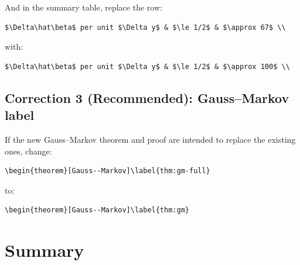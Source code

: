 And in the summary table, replace the row:

\begin{verbatim}
$\Delta\hat\beta$ per unit $\Delta y$ & $\le 1/2$ & $\approx 67$ \\
\end{verbatim}

with:

\begin{verbatim}
$\Delta\hat\beta$ per unit $\Delta y$ & $\le 1/2$ & $\approx 100$ \\
\end{verbatim}



\subsection*{Correction 3 (Recommended): Gauss--Markov label}

If the new Gauss--Markov theorem and proof are intended to replace the
existing ones, change:

\begin{verbatim}
\begin{theorem}[Gauss--Markov]\label{thm:gm-full}
\end{verbatim}

to:

\begin{verbatim}
\begin{theorem}[Gauss--Markov]\label{thm:gm}
\end{verbatim}



\section*{Summary}

